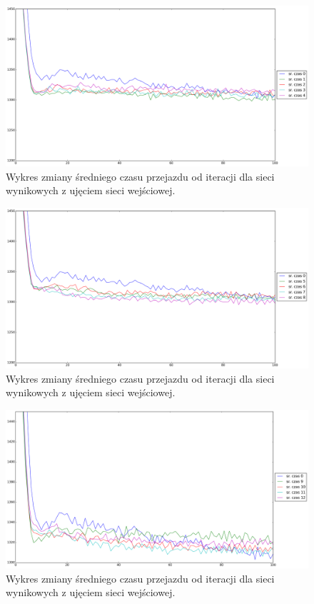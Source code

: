 \documentclass[twoside,12pt]{report}
\begin{document}
\begin{figure}[ht]
\centering
\includegraphics[width=1\textwidth]{img/iters/iters1}
\caption{Wykres zmiany średniego czasu przejazdu od iteracji dla sieci wynikowych z ujęciem sieci wejściowej.}
\label{iters1}
\end{figure}

\begin{figure}[ht]
\centering
\includegraphics[width=1\textwidth]{img/iters/iters2}
\caption{Wykres zmiany średniego czasu przejazdu od iteracji dla sieci wynikowych z ujęciem sieci wejściowej.}
\label{iters2}
\end{figure}

\begin{figure}[ht]
\centering
\includegraphics[width=1\textwidth]{img/iters/iters3}
\caption{Wykres zmiany średniego czasu przejazdu od iteracji dla sieci wynikowych z ujęciem sieci wejściowej.}
\label{iters3}
\end{figure}
\end{document}
